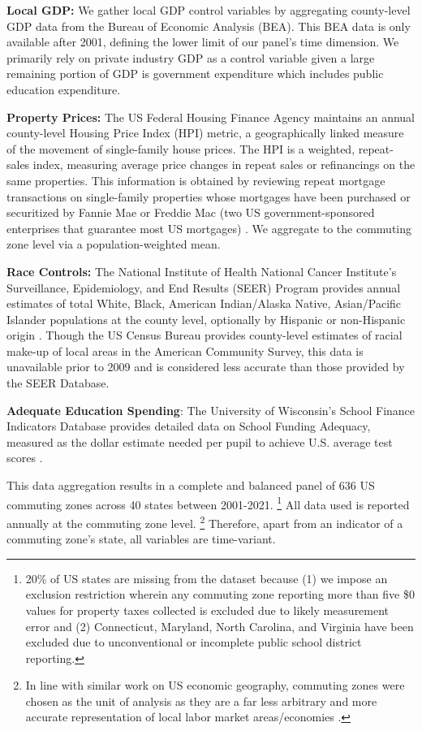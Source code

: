 \documentclass[
  10pt,
]{article}
\begin{document}
\textbf{Local GDP:} We gather local GDP control variables by aggregating
county-level GDP data from the Bureau of Economic Analysis (BEA). This
BEA data is only available after 2001, defining the lower limit of our
panel's time dimension. We primarily rely on private industry GDP as a
control variable given a large remaining portion of GDP is government
expenditure which includes public education expenditure.

\textbf{Property Prices:} The US Federal Housing Finance Agency
maintains an annual county-level Housing Price Index (HPI) metric, a
geographically linked measure of the movement of single-family house
prices. The HPI is a weighted, repeat-sales index, measuring average
price changes in repeat sales or refinancings on the same properties.
This information is obtained by reviewing repeat mortgage transactions
on single-family properties whose mortgages have been purchased or
securitized by Fannie Mae or Freddie Mac (two US government-sponsored
enterprises that guarantee most US mortgages)
\autocite{usfederalhousingfinanceagency}. We aggregate to the commuting
zone level via a population-weighted mean.

\textbf{Race Controls:} The National Institute of Health National Cancer
Institute's Surveillance, Epidemiology, and End Results (SEER) Program
provides annual estimates of total White, Black, American Indian/Alaska
Native, Asian/Pacific Islander populations at the county level,
optionally by Hispanic or non-Hispanic origin
\autocite{nationalcancerinstitutedccpssurveillanceresearchprogram}.
Though the US Census Bureau provides county-level estimates of racial
make-up of local areas in the American Community Survey, this data is
unavailable prior to 2009 and is considered less accurate than those
provided by the SEER Database.

\textbf{Adequate Education Spending}: The University of Wisconsin's
School Finance Indicators Database provides detailed data on School
Funding Adequacy, measured as the dollar estimate needed per pupil to
achieve U.S. average test scores \autocite{baker}.

This data aggregation results in a complete and balanced panel of 636 US
commuting zones across 40 states between 2001-2021. \footnote{20\% of US
  states are missing from the dataset because (1) we impose an exclusion
  restriction wherein any commuting zone reporting more than five \$0
  values for property taxes collected is excluded due to likely
  measurement error and (2) Connecticut, Maryland, North Carolina, and
  Virginia have been excluded due to unconventional or incomplete public
  school district reporting.} All data used is reported annually at the
commuting zone level. \footnote{In line with similar work on US economic
  geography, commuting zones were chosen as the unit of analysis as they
  are a far less arbitrary and more accurate representation of local
  labor market areas/economies \autocite{dorn,fowler2024}.} Therefore,
apart from an indicator of a commuting zone's state, all variables are
time-variant.
\end{document}

